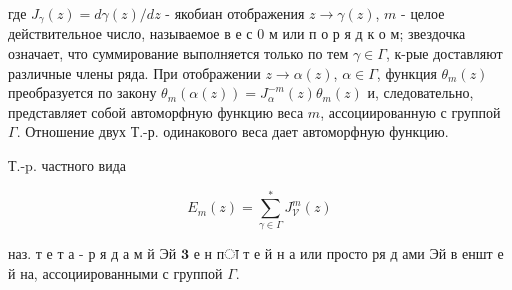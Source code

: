 \documentclass[10pt]{article}
\begin{document}
где $J_{\gamma}(z)=d \gamma(z) / d z$ - якобиан отображения $z \rightarrow \gamma(z)$, $m$ - целое действительное число, называемое в е с 0 м или п о р я д к о м; звездочка означает, что суммирование выполняется только по тем $\gamma \in \Gamma$, к-рые доставляют различные члены ряда. При отображении $z \rightarrow \alpha(z)$, $\alpha \in \Gamma$, функция $\theta_{m}(z)$ преобразуется по закону $\theta_{m}(\alpha(z))=J_{\alpha}^{-m}(z) \theta_{m}(z)$ и, следовательно, представляет собой автоморфную функцию веса $m$, ассоциированную с группой $\Gamma$. Отношение двух Т.-р. одинакового веса дает автоморфную функцию.



Т.-p. частного вида



\[

E_{m}(z)=\sum_{\gamma \in \Gamma}^{*} J_{\mathcal{V}}^{m}(z)

\]



наз. т е т а - р я д а м й Эй $\mathbf{3}$ е н пा т е й н а или просто ря д ами Эй в еншт е й на, ассоциированными с группой $\Gamma$.
\end{document}
